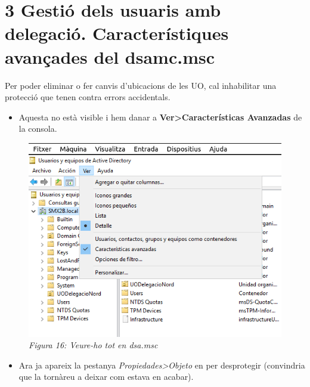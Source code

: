 \documentclass[
  a4paper,
]{article}
\providecommand{\tightlist}{%
  \setlength{\itemsep}{0pt}\setlength{\parskip}{0pt}}
\begin{document}
\section{3 Gestió dels usuaris amb delegació. Característiques avançades
del
dsamc.msc}\label{gestiuxf3-dels-usuaris-amb-delegaciuxf3.-caracteruxedstiques-avanuxe7ades-del-dsamc.msc}

Per poder eliminar o fer canvis d'ubicacions de les UO, cal inhabilitar
una protecció que tenen contra errors accidentals.

\begin{itemize}
\tightlist
\item
  Aquesta no està visible i hem danar a
  \textbf{Ver\textgreater Características Avanzadas} de la consola.
\end{itemize}

\begin{figure}
\centering
\includegraphics{png/dsaCarateristicasAvanzadas.png}
\caption{\emph{Figura 16: Veure-ho tot en dsa.msc}}
\end{figure}

\begin{itemize}
\tightlist
\item
  Ara ja apareix la pestanya \emph{Propiedades\textgreater Objeto} en
  per desprotegir (convindria que la tornàreu a deixar com estava en
  acabar).
\end{itemize}
\end{document}
